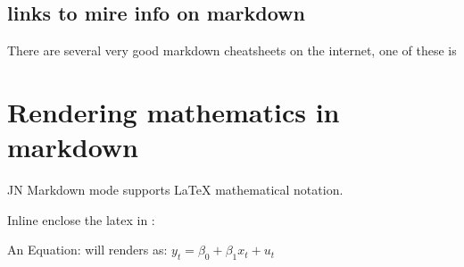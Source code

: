 \documentclass[letterpaper,10pt,english]{jupyterBook}
\begin{document}
\begin{sphinxVerbatim}[commandchars=\\\{\}]
                       
 \PYGZbs{}
 \PYGZbs{}
 \PYGZbs{}\PYGZbs{} \PYGZbs{}\PYGZbs{}      
 \PYGZbs{} \PYGZbs{}      
 \PYGZbs{}         

\end{sphinxVerbatim}


\subsection{links to mire info on markdown}
\label{\detokenize{content/04_PythonEssentials/Intro_Jupyter_notebook:links-to-mire-info-on-markdown}}
\sphinxAtStartPar
There are several very good markdown cheatsheets on the internet, one of these is 


\section{Rendering mathematics in markdown}
\label{\detokenize{content/04_PythonEssentials/Intro_Jupyter_notebook:rendering-mathematics-in-markdown}}
\sphinxAtStartPar
JN Markdown mode supports LaTeX mathematical notation.

\sphinxAtStartPar
Inline enclose the latex in \sphinxcode{\sphinxupquote{\$}}:

\sphinxAtStartPar
An Equation:  will renders as: \(y_t = \beta_0 + \beta_1 x_t + u_t\)
\end{document}
